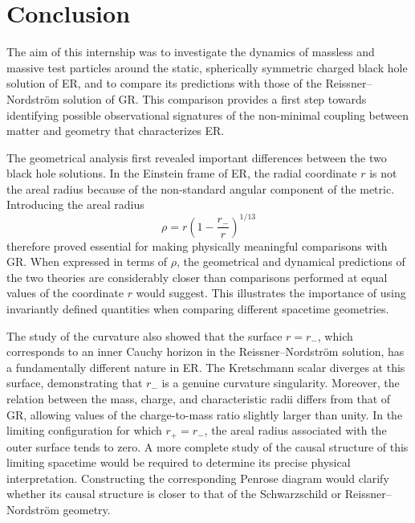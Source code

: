 \documentclass[floats,floatfix,aps, preprintnumbers,nofootinbib]{revtex4-2}
\begin{document}








\section{Conclusion}

The aim of this internship was to investigate the dynamics of massless and massive test particles around the static, spherically symmetric charged black hole solution of ER, and to compare its predictions with those of the Reissner–Nordström solution of GR. This comparison provides a first step towards identifying possible observational signatures of the non-minimal coupling between matter and geometry that characterizes ER.

The geometrical analysis first revealed important differences between the two black hole solutions. In the Einstein frame of ER, the radial coordinate $r$ is not the areal radius because of the non-standard angular component of the metric. Introducing the areal radius
\[
\rho=r\left(1-\frac{r_-}{r}\right)^{1/13}
\]
therefore proved essential for making physically meaningful comparisons with GR. When expressed in terms of $\rho$, the geometrical and dynamical predictions of the two theories are considerably closer than comparisons performed at equal values of the coordinate $r$ would suggest. This illustrates the importance of using invariantly defined quantities when comparing different spacetime geometries.

The study of the curvature also showed that the surface $r=r_-$, which corresponds to an inner Cauchy horizon in the Reissner–Nordström solution, has a fundamentally different nature in ER. The Kretschmann scalar diverges at this surface, demonstrating that $r_-$ is a genuine curvature singularity. Moreover, the relation between the mass, charge, and characteristic radii differs from that of GR, allowing values of the charge-to-mass ratio slightly larger than unity. In the limiting configuration for which $r_+=r_-$, the areal radius associated with the outer surface tends to zero. A more complete study of the causal structure of this limiting spacetime would be required to determine its precise physical interpretation. Constructing the corresponding Penrose diagram would clarify whether its causal structure is closer to that of the Schwarzschild or Reissner–Nordström geometry.
\end{document}

